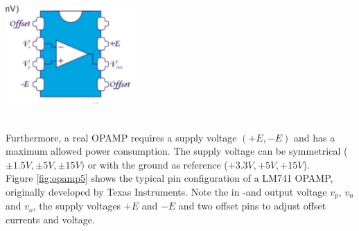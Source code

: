\begin{minipage}{.5\textwidth}
	\centering
	\includegraphics[width=5cm]{figures/ch02/opamp5.jpg}
	\label{fig:opamp5}
\end{minipage}
\\Furthermore, a real OPAMP requires a supply voltage $(+E, -E)$ and has a maximum allowed power consumption. The supply voltage can be symmetrical ($\pm 1.5V, \pm 5V, \pm 15V)$ or with the ground as reference ($+3.3V, +5V, +15V$).\\
Figure \ref{fig:opamp5} shows the typical pin configuration of a LM741 OPAMP, originally developed by Texas Instruments. Note the in -and output voltage $v_p$, $v_n$ and $v_o$, the supply voltages $+E$ and $-E$ and two offset pins to adjust offset currents and voltage.

